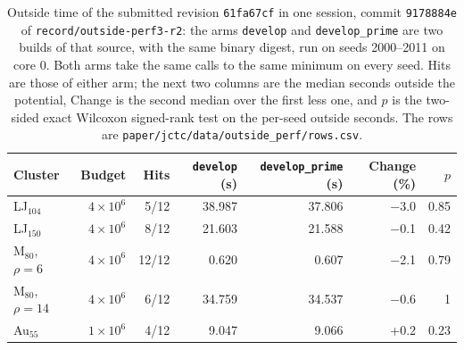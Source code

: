 \documentclass[journal=jctcce,manuscript=suppinfo]{achemso}
\begin{document}
\begin{table}
\caption{Outside time of the submitted revision \texttt{61fa67cf} in one session, commit
\texttt{9178884e} of \texttt{record/outside-perf3-r2}: the arms \texttt{develop} and
\texttt{develop\_prime} are two builds of that source, with the same binary digest, run on
seeds 2000--2011 on core 0.
Both arms take the same calls to the same minimum on every seed.
Hits are those of either arm; the next two columns are the median seconds outside the
potential, Change is the second median over the first less one, and \(p\) is the
two-sided exact Wilcoxon signed-rank test on the per-seed outside seconds.
The rows are \texttt{paper/\allowbreak jctc/\allowbreak data/\allowbreak outside\_perf/\allowbreak rows.csv}.}
\label{tab:si-outside}
\centering
\begin{tabular}{@{}lrrrrrr@{}}
\toprule
Cluster & Budget & Hits & \texttt{develop} (s) & \texttt{develop\_prime} (s) & Change (\%) & \(p\) \\
\midrule
LJ\(_{104}\) & \(4\times 10^{6}\) & 5/12 & 38.987 & 37.806 & \(-\)3.0 & 0.85 \\
LJ\(_{150}\) & \(4\times 10^{6}\) & 8/12 & 21.603 & 21.588 & \(-\)0.1 & 0.42 \\
M\(_{80}\), \(\rho=6\) & \(4\times 10^{6}\) & 12/12 & 0.620 & 0.607 & \(-\)2.1 & 0.79 \\
M\(_{80}\), \(\rho=14\) & \(4\times 10^{6}\) & 6/12 & 34.759 & 34.537 & \(-\)0.6 & 1 \\
Au\(_{55}\) & \(1\times 10^{6}\) & 4/12 & 9.047 & 9.066 & +0.2 & 0.23 \\
\bottomrule
\end{tabular}
\end{table}
\end{document}
